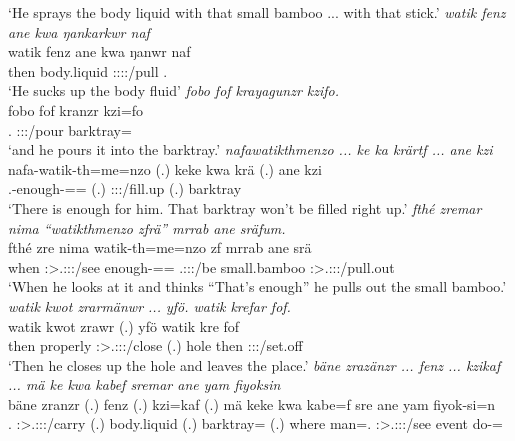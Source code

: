 \begin{exe}
	\trans `He sprays the body liquid with that small bamboo ... with that stick.'
	\emph{watik fenz ane kwa ŋankarkwr naf}\\
	\gll watik fenz ane kwa ŋanwr naf\\
	then body.liquid \Dem{} \Fut{} \Stsg:\Sbj:\Nonpast:\Ipfv:\Venit/pull \Tsg.\Erg{}\\
	\trans `He sucks up the body fluid'
	\emph{fobo fof krayagunzr kzifo.}\\
	\gll fobo fof kranzr kzi=fo\\
	\Dist.\All{} \Emph{} \Stsg:\Sbj:\Irr:\Ipfv/pour barktray=\All{}\\
	\trans `and he pours it into the barktray.'
	\emph{nafawatikthmenzo ... ke ka krärtf ... ane kzi}\\
	\gll nafa-watik-th=me=nzo (.) keke kwa krä (.) ane kzi\\
	\Third.\Poss-enough-\Adlzr=\Ins=\Only{} (.) \Neg{} \Fut{} \Stsg:\Obj:\Irr:\Ipfv/fill.up (.) \Dem{} barktray\\
	\trans `There is enough for him. That barktray won't be filled right up.'
	\emph{fthé zremar nima ``watikthmenzo zfrä'' mrrab ane sräfum.}\\
	\gll fthé zre nima watik-th=me=nzo zf mrrab ane srä\\
	when \Stsg:\Sbj>\Tsg.\F:\Obj:\Irr:\Pfv/see \Quot{} enough-\Adlzr=\Ins=\Only{} \Tsg.\F:\Sbj:\Rpst:\Ipfv/be small.bamboo \Dem{} \Stsg:\Sbj>\Tsg.\Masc:\Obj:\Irr:\Ipfv/pull.out\\
	\trans `When he looks at it and thinks ``That's enough'' he pulls out the small bamboo.'
	\emph{watik kwot zrarmänwr ... yfö. watik krefar fof.}\\
	\gll watik kwot zrawr (.) yfö watik kre fof\\
	then properly \Stsg:\Sbj>\Tsg.\F:\Obj:\Irr:\Ipfv/close (.) hole then \Stsg:\Sbj:\Irr:\Pfv/set.off \Emph{}\\
	\trans `Then he closes up the hole and leaves the place.'
	\emph{bäne zrazänzr ... fenz ... kzikaf ... mä ke kwa kabef sremar ane yam fiyoksin}\\
	\gll bäne zranzr (.) fenz (.) kzi=kaf (.) mä keke kwa kabe=f sre ane yam fiyok-si=n\\
	\Recog.\Abs{} \Stsg:\Sbj>\Tsg.\F:\Obj:\Irr:\Ipfv/carry (.) body.liquid (.) barktray=\Prop{} (.) where \Neg{} \Fut{} man=\Erg.\Sg{} \Stsg:\Sbj>\Tsg.\Masc:\Obj:\Irr:\Pfv/see \Dem{} event do-\Nmlz=\Loc{}\\

\end{exe}

